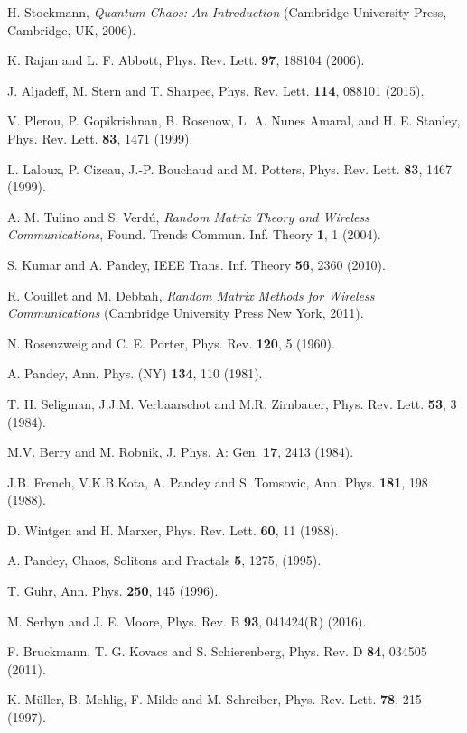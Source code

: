 \documentclass[reprint,amsmath,amssymb,showpacs,aps,]{revtex4-1}
\begin{document}
{\begin{thebibliography}{9}
H. Stockmann, \textit{Quantum Chaos: An Introduction} (Cambridge University Press, Cambridge, UK, 2006).

K. Rajan and L. F. Abbott, Phys. Rev. Lett. \textbf{97}, 188104 (2006).

J. Aljadeff, M. Stern and T. Sharpee, Phys. Rev. Lett. \textbf{114}, 088101 (2015).

V. Plerou, P. Gopikrishnan, B. Rosenow, L. A. Nunes Amaral, and H. E. Stanley, Phys. Rev. Lett. \textbf{83}, 1471 (1999).

L. Laloux, P. Cizeau, J.-P. Bouchaud and M. Potters, Phys. Rev. Lett. \textbf{83}, 1467 (1999).

A. M. Tulino and S. Verdú, \textit{Random Matrix Theory and Wireless Communications}, Found. Trends Commun. Inf. Theory \textbf{1}, 1 (2004).

S. Kumar and A. Pandey, IEEE Trans. Inf. Theory \textbf{56}, 2360 (2010).

R. Couillet and M. Debbah, \textit{Random Matrix Methods for Wireless Communications} (Cambridge University Press New York, 2011).

N. Rosenzweig and C. E. Porter, Phys. Rev. \textbf{120}, 5 (1960).

A. Pandey, Ann. Phys. (NY) \textbf{134}, 110 (1981).

T. H. Seligman, J.J.M. Verbaarschot and M.R. Zirnbauer, Phys. Rev. Lett. \textbf{53}, 3 (1984).

M.V. Berry and M. Robnik, J. Phys. A: Gen. \textbf{17}, 2413 (1984).

J.B. French, V.K.B.Kota, A. Pandey and S. Tomsovic, Ann. Phys. \textbf{181}, 198 (1988).

D. Wintgen and H. Marxer, Phys. Rev. Lett. \textbf{60}, 11 (1988).

 A. Pandey, Chaos, Solitons and Fractals \textbf{5}, 1275, (1995).
 
T. Guhr, Ann. Phys. \textbf{250}, 145 (1996).

M. Serbyn and J. E. Moore, Phys. Rev. B \textbf{93}, 041424(R) (2016).

F. Bruckmann, T. G. Kovacs and S. Schierenberg, Phys. Rev. D \textbf{84}, 034505 (2011).

K. Müller, B. Mehlig, F. Milde and M. Schreiber, Phys. Rev. Lett. \textbf{78}, 215 (1997).


\end{thebibliography}}
\end{document}
